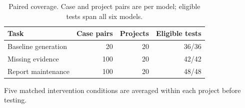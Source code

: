 \begin{table}[t]
\centering\small
\setlength{\tabcolsep}{4pt}
\caption{Paired coverage. Case and project pairs are per model; eligible tests span all six models.}
\label{tab:supp-pairs}
\begin{tabular}{lrrr}
\toprule
Task & Case pairs & Projects & Eligible tests \\
\midrule
Baseline generation & 20 & 20 & 36/36 \\
Missing evidence & 100 & 20 & 42/42 \\
Report maintenance & 100 & 20 & 48/48 \\
\bottomrule
\end{tabular}
\par\vspace{3pt}
\begin{minipage}{0.98\linewidth}\footnotesize
Five matched intervention conditions are averaged within each project before testing.
\end{minipage}
\end{table}
